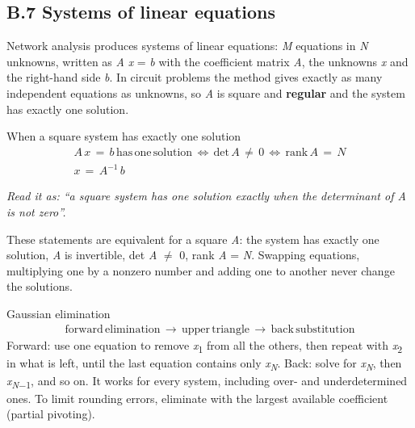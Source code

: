 \documentclass[11pt]{article}
\begin{document}
\begin{keepsection}
\section{B.7 Systems of linear equations}

Network analysis produces systems of linear equations: \textit{M} equations in \textit{N} unknowns, written as \textit{A} \textit{x} = \textit{b} with the coefficient matrix \textit{A}, the unknowns \textit{x} and the right-hand side \textit{b}. In circuit problems the method gives exactly as many independent equations as unknowns, so \textit{A} is square and \textbf{regular} and the system has exactly one solution.

\begin{equationcard}{When a square system has exactly one solution}
\[ \begin{gathered} {A}\, {x}\, =\, {b}\, \text{has}\, \text{one}\, \text{solution}\, \Leftrightarrow \, \text{det}\, {A}\, ≠\, 0\, \Leftrightarrow \, \text{rank}\, {A}\, =\, {N} \\ {x}\, =\, {A}^{-1}\, {b} \end{gathered} \]
{\small \emph{Read it as: “a square system has one solution exactly when the determinant of A is not zero”.}\par These statements are equivalent for a square \textit{A}: the system has exactly one solution, \textit{A} is invertible, det \textit{A} \ensuremath{\neq} 0, rank \textit{A} = \textit{N}. Swapping equations, multiplying one by a nonzero number and adding one to another never change the solutions.}
\end{equationcard}

\begin{equationcard}{Gaussian elimination}
\[ \begin{gathered} \text{forward}\, \text{elimination}\, \to \, \text{upper}\, \text{triangle}\, \to \, \text{back}\, \text{substitution} \end{gathered} \]
{\small Forward: use one equation to remove \textit{x}\textsubscript{1} from all the others, then repeat with \textit{x}\textsubscript{2} in what is left, until the last equation contains only \textit{x}\textsubscript{\textit{N}}. Back: solve for \textit{x}\textsubscript{\textit{N}}, then \textit{x}\textsubscript{\textit{N}\ensuremath{-}1}, and so on. It works for every system, including over- and underdetermined ones. To limit rounding errors, eliminate with the largest available coefficient (partial pivoting).}
\end{equationcard}


\end{keepsection}
\end{document}
